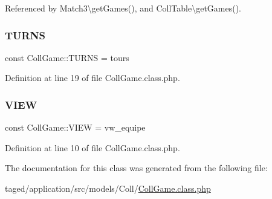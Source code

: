 Referenced by Match3\textbackslash{}get\+Games(), and Coll\+Table\textbackslash{}get\+Games().

\mbox{\label{class_coll_game_a9382591780bedeaec6f403ea5e88a33c}} 
\subsubsection{\texorpdfstring{T\+U\+R\+NS}{TURNS}}
{\footnotesize\ttfamily const Coll\+Game\+::\+T\+U\+R\+NS = \textquotesingle{}tours\textquotesingle{}}



Definition at line 19 of file Coll\+Game.\+class.\+php.

\mbox{\label{class_coll_game_a3e457569e1db161c5adca582fbe0bfd8}} 
\subsubsection{\texorpdfstring{V\+I\+EW}{VIEW}}
{\footnotesize\ttfamily const Coll\+Game\+::\+V\+I\+EW = \textquotesingle{}vw\+\_\+equipe\textquotesingle{}}



Definition at line 10 of file Coll\+Game.\+class.\+php.



The documentation for this class was generated from the following file\+:\begin{DoxyCompactItemize}
\item 
taged/application/src/models/\+Coll/\hyperlink{_coll_game_8class_8php}{Coll\+Game.\+class.\+php}\end{DoxyCompactItemize}
